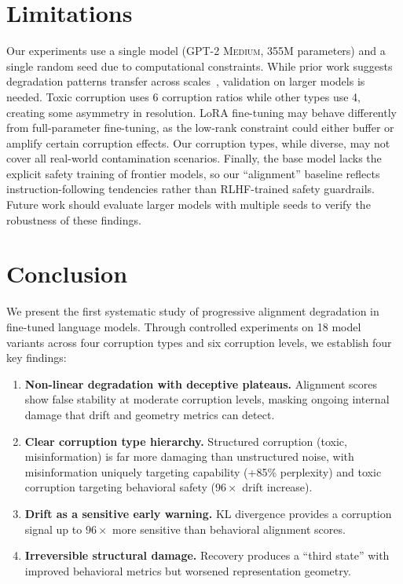 \documentclass[conference]{IEEEtran}
\newcommand{\model}{\textsc{GPT-2 Medium}}
\begin{document}
\section{Limitations}
\label{sec:limitations}

Our experiments use a single model (\model{}, 355M parameters) and a single random seed due to computational constraints. While prior work suggests degradation patterns transfer across scales~\cite{mazeika2025scaling}, validation on larger models is needed. Toxic corruption uses 6 corruption ratios while other types use 4, creating some asymmetry in resolution. LoRA fine-tuning may behave differently from full-parameter fine-tuning, as the low-rank constraint could either buffer or amplify certain corruption effects. Our corruption types, while diverse, may not cover all real-world contamination scenarios. Finally, the base model lacks the explicit safety training of frontier models, so our ``alignment'' baseline reflects instruction-following tendencies rather than RLHF-trained safety guardrails. Future work should evaluate larger models with multiple seeds to verify the robustness of these findings.

\section{Conclusion}
\label{sec:conclusion}

We present the first systematic study of progressive alignment degradation in fine-tuned language models. Through controlled experiments on 18 model variants across four corruption types and six corruption levels, we establish four key findings:

\begin{enumerate}
    \item \textbf{Non-linear degradation with deceptive plateaus.} Alignment scores show false stability at moderate corruption levels, masking ongoing internal damage that drift and geometry metrics can detect.

    \item \textbf{Clear corruption type hierarchy.} Structured corruption (toxic, misinformation) is far more damaging than unstructured noise, with misinformation uniquely targeting capability (+85\% perplexity) and toxic corruption targeting behavioral safety ($96\times$ drift increase).

    \item \textbf{Drift as a sensitive early warning.} KL divergence provides a corruption signal up to $96\times$ more sensitive than behavioral alignment scores.

    \item \textbf{Irreversible structural damage.} Recovery produces a ``third state'' with improved behavioral metrics but worsened representation geometry.
\end{enumerate}
\end{document}
